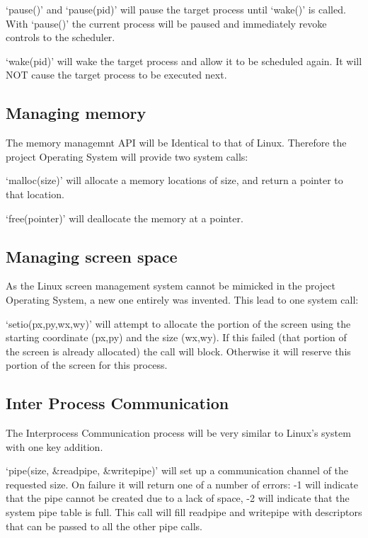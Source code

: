 \documentclass[a4paper]{report}
\begin{document}
`pause()' and `pause(pid)' will pause the target process until `wake()' is called. With `pause()' the current process will be paused and immediately revoke controls to the scheduler.

`wake(pid)' will wake the target process and allow it to be scheduled again. It will NOT cause the target process to be executed next.

\subsection{Managing memory}

The memory managemnt API will be Identical to that of Linux. Therefore the project Operating System will provide two system calls:

`malloc(size)' will allocate a memory locations of size, and return a pointer to that location.

`free(pointer)' will deallocate the memory at a pointer.

\subsection{Managing screen space}

As the Linux screen management system cannot be mimicked in the project Operating System, a new one entirely was invented. This lead to one system call:

`setio(px,py,wx,wy)' will attempt to allocate the portion of the screen using the starting coordinate (px,py) and the size (wx,wy). If this failed (that portion of the screen is already allocated) the call will block. Otherwise it will reserve this portion of the screen for this process.


\subsection{Inter Process Communication}

The Interprocess Communication process will be very similar to Linux's system with one key addition.

`pipe(size, \&readpipe, \&writepipe)' will set up a communication channel of the requested size. On failure it will return one of a number of errors: -1 will indicate that the pipe cannot be created due to a lack of space, -2 will indicate that the system pipe table is full. This call will fill readpipe and writepipe with descriptors that can be passed to all the other pipe calls.
\end{document}
